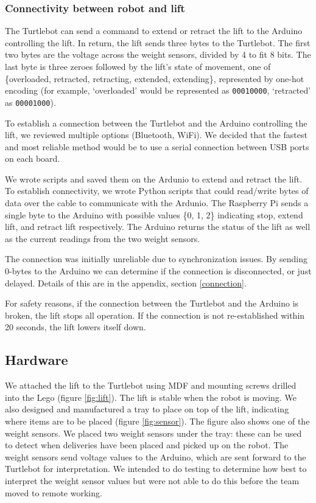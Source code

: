 \documentclass{article}
\begin{document}
\subsubsection{Connectivity between robot and lift}
The Turtlebot can send a command to extend or retract the lift to the Arduino controlling the lift. In return, the lift sends three bytes to the Turtlebot. The first two bytes are the voltage across the weight sensors, divided by 4 to fit 8 bits. The last byte is three zeroes followed by the lift's state of movement, one of \{overloaded, retracted, retracting, extended, extending\}, represented by one-hot encoding (for example, `overloaded' would be represented as {\tt 00010000}, `retracted' as {\tt 00001000}). 

To establish a connection between the Turtlebot and the Arduino controlling the lift, we reviewed multiple options (Bluetooth, WiFi). We decided that the fastest and most reliable method would be to use a serial connection between USB ports on each board.

We wrote scripts and saved them on the Ardunio to extend and retract the lift. To establish connectivity, we wrote Python scripts that could read/write bytes of data over the cable to communicate with the Ardunio. The Raspberry Pi sends a single byte to the Arduino with possible values \{0, 1, 2\} indicating stop, extend lift, and retract lift respectively. The Arduino returns the status of the lift as well as the current readings from the two weight sensors.

The connection was initially unreliable due to synchronization issues. By sending 0-bytes to the Arduino we can determine if the connection is disconnected, or just delayed. Details of this are in the appendix, section \ref{connection}.

For safety reasons, if the connection between the Turtlebot and the Arduino is broken, the lift stops all operation. If the connection is not re-established within 20 seconds, the lift lowers itself down.  

\subsection{Hardware}
We attached the lift to the Turtlebot using MDF and mounting screws drilled into the Lego (figure \ref{fig:lift}). The lift is stable when the robot is moving. We also designed and manufactured a tray to place on top of the lift, indicating where items are to be placed (figure \ref{fig:sensor}). The figure also shows one of the weight sensors. We placed two weight sensors under the tray: these can be used to detect when deliveries have been placed and picked up on the robot. The weight sensors send voltage values to the Arduino, which are sent forward to the Turtlebot for interpretation. We intended to do testing to determine how best to interpret the weight sensor values but were not able to do this before the team moved to remote working. 
\end{document}
